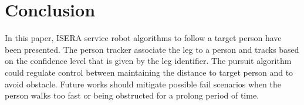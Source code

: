 \documentclass[10 pt,a4paper,conference]{IEEEtran}
\begin{document}
\section{Conclusion}\label{conclusion}

In this paper, ISERA service robot algorithms to follow a target person
have been presented. The person tracker associate the leg to a person
and tracks based on the confidence level that is given by the leg
identifier. The pursuit algorithm could regulate control between
maintaining the distance to target person and to avoid obstacle. Future
works should mitigate possible fail scenarios when the person walks too
fast or being obstructed for a prolong period of time.

\small

                                    \renewcommand\refname{References}
                        

    
\end{document}
